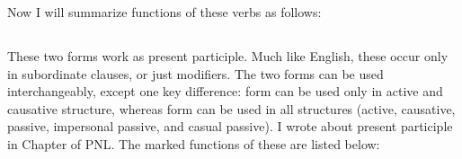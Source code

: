 Now I will summarize functions of these verbs as follows:

{}
\subsection*{} 

These two forms work as present participle. Much like English, these occur only in subordinate clauses, or just modifiers. The two forms can be used interchangeably, except one key difference:  form can be used only in active and causative structure, whereas  form can be used in all structures (active, causative, passive, impersonal passive, and casual passive). I wrote about present participle in Chapter  of PNL. The marked functions of these are listed below:

